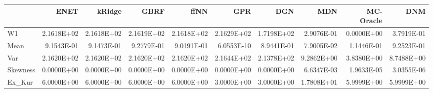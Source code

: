 \begin{tabular}{lrrrrrrrrr}
\toprule
{} &       ENET &     kRidge &       GBRF &       ffNN &        GPR &        DGN &        MDN &  MC-Oracle &        DNM \\
\midrule
W1       & 2.1618E+02 & 2.1618E+02 & 2.1619E+02 & 2.1618E+02 & 2.1629E+02 & 1.7198E+02 & 2.9076E-01 & 0.0000E+00 & 3.7919E-01 \\
Mean     & 9.1543E-01 & 9.1473E-01 & 9.2779E-01 & 9.0191E-01 & 6.0553E-10 & 8.9441E-01 & 7.9005E-02 & 1.1446E-01 & 9.2523E-01 \\
Var      & 2.1620E+02 & 2.1620E+02 & 2.1620E+02 & 2.1620E+02 & 2.1644E+02 & 2.1378E+02 & 9.2862E+00 & 3.8380E+00 & 8.7488E+00 \\
Skewness & 0.0000E+00 & 0.0000E+00 & 0.0000E+00 & 0.0000E+00 & 0.0000E+00 & 0.0000E+00 & 6.6347E-03 & 1.9633E-05 & 3.0355E-06 \\
Ex\_Kur   & 6.0000E+00 & 6.0000E+00 & 6.0000E+00 & 6.0000E+00 & 3.0000E+00 & 3.0000E+00 & 1.7808E+01 & 5.9999E+00 & 5.9999E+00 \\
\bottomrule
\end{tabular}

